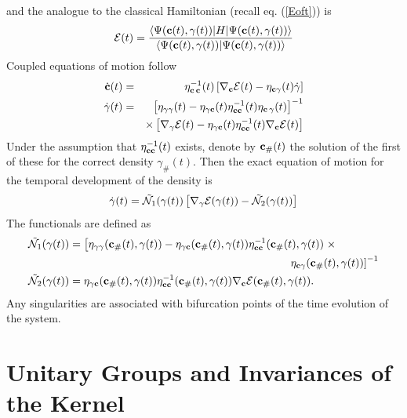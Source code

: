 and the analogue to the classical Hamiltonian (recall eq. (\ref{Eoft})) is 
\begin{equation}
{\cal E}(t)=\frac{\left\langle \Psi ({\bf c}(t),\gamma (t))|H|\Psi ({\bf c}%
(t),\gamma (t))\right\rangle }{\left\langle \Psi ({\bf c}(t),\gamma
(t))|\Psi ({\bf c}(t),\gamma (t))\right\rangle }  \label{Eofcgammat}
\end{equation}%
Coupled equations of motion follow 
\begin{eqnarray}
\dot{{\bf c}}(t) &=&\eta _{{\bf c\,c}}^{-1}(t)\left[ \nabla _{{\bf c}}{\cal E%
}(t)-\eta _{{\bf c}\gamma }(t)\dot{\gamma}\right]  \nonumber \\
\dot{\gamma}(t) &=&\left[ \eta _{\gamma \gamma }(t)-\eta _{\gamma {\bf c}%
}(t)\eta _{{\bf cc}}^{-1}(t)\eta _{{\bf c}\,\gamma }(t)\right] ^{-1} 
\nonumber \\
&&\times \left[ \nabla _{\gamma }{\cal E}(t)-\eta _{\gamma {\bf c}}(t)\eta _{%
{\bf cc}}^{-1}(t)\nabla _{{\bf c}}{\cal E}(t)\right]  \label{cdotgammadot}
\end{eqnarray}%
Under the assumption that $\eta _{{\bf cc}}^{-1}(t)$ exists, denote by ${\bf %
c}_{\#}(t)$ the solution of the first of these for the correct density $%
\gamma _{\#}(t)$. Then the exact equation of motion for the temporal
development of the density is 
\begin{equation}
\dot{\gamma}(t)=\tilde{{\cal N}_{1}}(\gamma (t))\left[ \nabla _{\gamma }%
{\cal E}(\gamma (t))-\tilde{{\cal N}_{2}}(\gamma (t))\right]
\label{Appgammadot}
\end{equation}%
The functionals are defined as 
\begin{align}
\tilde{{\cal N}_{1}}(\gamma (t))& =\left[ \eta _{\gamma \gamma }({\bf c}%
_{\#}(t),\gamma (t))-\eta _{\gamma {\bf c}}({\bf c}_{\#}(t),\gamma (t))\eta
_{{\bf cc}}^{-1}({\bf c}_{\#}(t),\gamma (t))\right. \times  \nonumber \\
& \qquad \qquad \qquad \qquad \qquad \qquad \qquad \qquad \qquad \qquad
\left. \eta _{{\bf c}\gamma }({\bf c}_{\#}(t),\gamma (t))\right] ^{-1} 
\nonumber \\
\tilde{{\cal N}_{2}}(\gamma (t))& =\eta _{\gamma {\bf c}}({\bf c}%
_{\#}(t),\gamma (t))\eta _{{\bf cc}}^{-1}({\bf c}_{\#}(t),\gamma (t))\nabla
_{{\bf c}}{\cal E}({\bf c}_{\#}(t),\gamma (t)).\quad
\end{align}%
Any singularities are associated with bifurcation points of the time
evolution of the system.

\section{Unitary Groups and Invariances of the Kernel}

